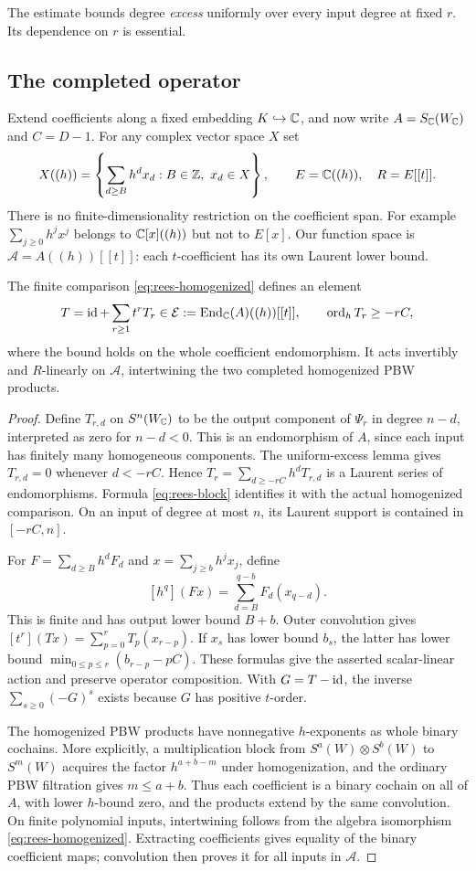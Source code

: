 The estimate bounds degree \emph{excess} uniformly over every input
degree at fixed $r$. Its dependence on $r$ is essential.

\subsection{The completed operator}

Extend coefficients along a fixed embedding $K\hookrightarrow\mathbb C$,
and now write $A=S_\mathbb C(W_\mathbb C)$ and $C=D-1$.
For any complex vector space $X$ set
\[
 X((h))=
 \left\{\sum_{d\geq B}h^dx_d:
 B\in\mathbb Z,\ x_d\in X\right\},\qquad
 E=\mathbb C((h)),\quad R=E[[t]].
\]
There is no finite-dimensionality restriction on the coefficient
span. For example $\sum_{j\geq0}h^jx^j$ belongs to
$\mathbb C[x]((h))$ but not to $E[x]$.
Our function space is
$\mathcal A=A((h))[[t]]$: each $t$-coefficient has its own
Laurent lower bound.

\begin{proposition}\label{prop:Laurent-operator-bound}
The finite comparison \eqref{eq:rees-homogenized} defines an element
\[
 T=\operatorname{id}+\sum_{r\geq1}t^rT_r
 \in\mathcal E:=\operatorname{End}_\mathbb C(A)((h))[[t]],
 \qquad \operatorname{ord}_h T_r\geq-rC,
\]
where the bound holds on the whole coefficient endomorphism.
It acts invertibly and $R$-linearly on $\mathcal A$, intertwining
the two completed homogenized PBW products.
\end{proposition}

\begin{proof}
Define $T_{r,d}$ on $S^n(W_\mathbb C)$ to be the output component
of $\Psi_r$ in degree $n-d$, interpreted as zero for $n-d<0$.
This is an endomorphism of $A$, since each input has finitely
many homogeneous components. The uniform-excess lemma gives
$T_{r,d}=0$ whenever $d<-rC$. Hence
$T_r=\sum_{d\geq-rC}h^dT_{r,d}$ is a Laurent series of
endomorphisms. Formula \eqref{eq:rees-block} identifies it with
the actual homogenized comparison. On an input of degree at most
$n$, its Laurent support is contained in $[-rC,n]$.

For $F=\sum_{d\geq B}h^dF_d$ and
$x=\sum_{j\geq b}h^jx_j$, define
\[
 [h^q](Fx)=\sum_{d=B}^{q-b}F_d(x_{q-d}).
\]
This is finite and has output lower bound $B+b$.
Outer convolution gives
$[t^r](Tx)=\sum_{p=0}^rT_p(x_{r-p})$.
If $x_s$ has lower bound $b_s$, the latter has lower bound
$\min_{0\leq p\leq r}(b_{r-p}-pC)$.
These formulas give the asserted scalar-linear action and preserve
operator composition. With $G=T-\operatorname{id}$, the inverse
$\sum_{s\geq0}(-G)^s$ exists because $G$ has positive $t$-order.

The homogenized PBW products have nonnegative $h$-exponents
as whole binary cochains. More explicitly, a multiplication block
from $S^a(W)\otimes S^b(W)$ to $S^m(W)$ acquires the factor
$h^{a+b-m}$ under homogenization, and the ordinary PBW filtration
gives $m\leq a+b$. Thus each coefficient is a binary cochain on
all of $A$, with lower $h$-bound zero, and the products extend
by the same convolution. On finite polynomial inputs,
intertwining follows from the algebra isomorphism
\eqref{eq:rees-homogenized}. Extracting coefficients gives equality
of the binary coefficient maps; convolution then proves it for
all inputs in $\mathcal A$.
\end{proof}

